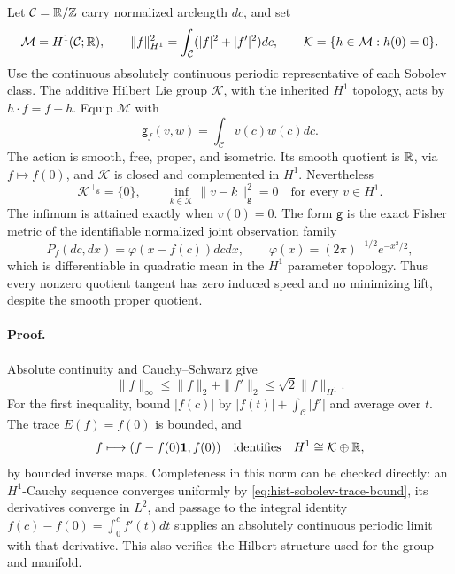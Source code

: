 Let \(\mathcal C=\mathbb R/\mathbb Z\) carry normalized arclength \(dc\), and set
\begin{equation}
\mathcal M=H^1(\mathcal C;\mathbb R),
\qquad
\|f\|_{H^1}^2=\int_{\mathcal C}(|f|^2+|f'|^2)dc,
\qquad
\mathcal K=\{h\in\mathcal M:h(0)=0\}.
\label{eq:hist-weak-sobolev-model}
\end{equation}
Use the continuous absolutely continuous periodic representative of each
Sobolev class. The additive Hilbert Lie group \(\mathcal K\), with the
inherited \(H^1\) topology, acts by \(h\cdot f=f+h\). Equip
\(\mathcal M\) with
\begin{equation}
\mathsf g_f(v,w)=\int_{\mathcal C}v(c)w(c)dc.
\label{eq:hist-weak-integrated-fisher}
\end{equation}
The action is smooth, free, proper, and isometric. Its smooth quotient is
\(\mathbb R\), via \(f\mapsto f(0)\), and \(\mathcal K\) is closed and
complemented in \(H^1\). Nevertheless
\begin{equation}
\mathcal K^{\perp_{\mathsf g}}=\{0\},
\qquad
\inf_{k\in\mathcal K}\|v-k\|_{\mathsf g}^2=0
\quad\text{for every }v\in H^1.
\label{eq:hist-weak-quotient-collapse}
\end{equation}
The infimum is attained exactly when \(v(0)=0\).
The form \(\mathsf g\) is the exact Fisher metric of the identifiable
normalized joint observation family
\begin{equation}
P_f(dc,dx)=\varphi(x-f(c))dc dx,
\qquad
\varphi(x)=(2\pi)^{-1/2}e^{-x^2/2},
\label{eq:hist-weak-joint-law}
\end{equation}
which is differentiable in quadratic mean in the \(H^1\) parameter topology.
Thus every nonzero quotient tangent has zero induced speed and no minimizing
lift, despite the smooth proper quotient. 

\paragraph{Proof.}
Absolute continuity and Cauchy--Schwarz give
\begin{equation}
\|f\|_\infty\leq\|f\|_2+\|f'\|_2
\leq\sqrt2\|f\|_{H^1}.
\label{eq:hist-sobolev-trace-bound}
\end{equation}
For the first inequality, bound \(|f(c)|\) by
\(|f(t)|+\int_{\mathcal C}|f'|\) and average over \(t\).
The trace \(E(f)=f(0)\) is bounded, and
\begin{equation}
f\longmapsto(f-f(0)\mathbf1,f(0))
\quad\text{identifies}\quad
H^1\cong\mathcal K\oplus\mathbb R,
\label{eq:hist-trace-topological-splitting}
\end{equation}
by bounded inverse maps. Completeness in this norm can be checked directly:
an \(H^1\)-Cauchy sequence converges uniformly by
\eqref{eq:hist-sobolev-trace-bound}, its derivatives converge in \(L^2\),
and passage to the integral identity
\(f(c)-f(0)=\int_0^c f'(t)dt\) supplies an absolutely continuous periodic
limit with that derivative. This also verifies the Hilbert structure
used for the group and manifold.

